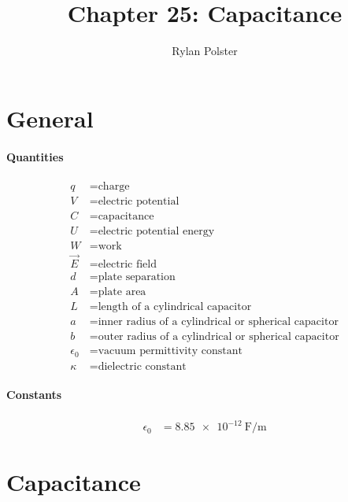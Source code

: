 \documentclass{article}
\title{Chapter 25: Capacitance}
\author{Rylan Polster}
\begin{document}
    \maketitle
    
    \section*{General}

        \paragraph{Quantities}
        \begin{align}
            q &= \text{charge} \nonumber\\
            V &= \text{electric potential} \nonumber\\
            C &= \text{capacitance} \nonumber\\
            U &= \text{electric potential energy} \nonumber\\
            W &= \text{work} \nonumber\\
            \vec{E} &= \text{electric field} \nonumber\\
            d &= \text{plate separation} \nonumber\\
            A &= \text{plate area} \nonumber\\
            L &= \text{length of a cylindrical capacitor} \nonumber\\
            a &= \text{inner radius of a cylindrical or spherical capacitor} \nonumber\\
            b &= \text{outer radius of a cylindrical or spherical capacitor} \nonumber\\
            \epsilon_0 &= \text{vacuum permittivity constant} \nonumber\\
            \kappa &= \text{dielectric constant} \nonumber
        \end{align}

        \paragraph{Constants}
        \begin{align}
            \epsilon_0 &= \SI[per-mode=fraction]{8.85e-12}{\farad\per\meter} \nonumber
        \end{align}

    \section{Capacitance}
\end{document}
